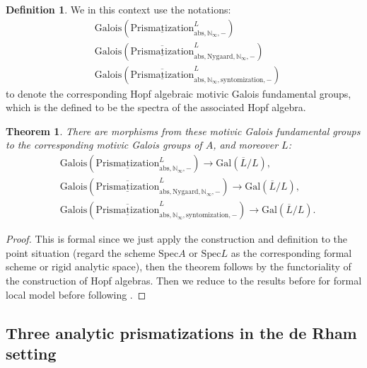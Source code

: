 \documentclass[12pt]{article}
\newtheorem{theorem}{Theorem}
\theoremstyle{definition}
\newtheorem{definition}{Definition}
\begin{document}
\begin{definition}
We in this context use the notations:
\begin{align}
&\mathrm{Galois}(\underline{\mathrm{Prismatization}}^L_{\mathrm{abs},\mathbb{N}_\infty,-})\\
&\mathrm{Galois}(\overline{\underline{\mathrm{Prismatization}}}^L_{\mathrm{abs},\mathrm{Nygaard},\mathbb{N}_\infty,-})\\
&\mathrm{Galois}(\overline{\underline{\mathrm{Prismatization}}}^L_{\mathrm{abs},\mathbb{N}_\infty,\mathrm{syntomization},-})
\end{align}
to denote the corresponding Hopf algebraic motivic Galois fundamental groups, which is the defined to be the spectra of the associated Hopf algebra.
\end{definition}


\begin{theorem}
There are morphisms from these motivic Galois fundamental groups to the corresponding motivic Galois groups of $A$, and moreover $L$: 
\begin{align}
&\mathrm{Galois}(\underline{\mathrm{Prismatization}}^L_{\mathrm{abs},\mathbb{N}_\infty,-})\rightarrow \mathrm{Gal}(\overline{L}/L),\\
&\mathrm{Galois}(\overline{\underline{\mathrm{Prismatization}}}^L_{\mathrm{abs},\mathrm{Nygaard},\mathbb{N}_\infty,-})\rightarrow \mathrm{Gal}(\overline{L}/L),\\
&\mathrm{Galois}(\overline{\underline{\mathrm{Prismatization}}}^L_{\mathrm{abs},\mathbb{N}_\infty,\mathrm{syntomization},-})\rightarrow \mathrm{Gal}(\overline{L}/L).
\end{align}
\end{theorem}

\begin{proof}
This is formal since we just apply the construction and definition to the point situation (regard the scheme $\mathrm{Spec}A$ or $\mathrm{Spec}L$ as the corresponding formal scheme or rigid analytic space), then the theorem follows by the functoriality of the construction of Hopf algebras. Then we reduce to the results before for formal local model before following \cite{3A}. 
\end{proof}


\subsection{Three analytic prismatizations in the de Rham setting}
\end{document}
